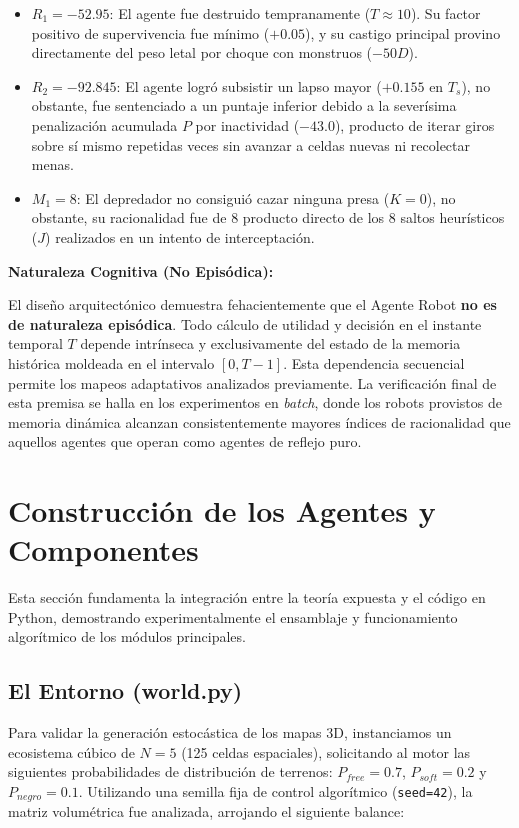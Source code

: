 \documentclass[conference]{IEEEtran}
\begin{document}
\begin{itemize}
    \item \textbf{$R_1 = -52.95$}: El agente fue destruido tempranamente ($T \approx 10$). Su factor positivo de supervivencia fue mínimo ($+0.05$), y su castigo principal provino directamente del peso letal por choque con monstruos ($-50 D$).
    \item \textbf{$R_2 = -92.845$}: El agente logró subsistir un lapso mayor ($+0.155$ en $T_s$), no obstante, fue sentenciado a un puntaje inferior debido a la severísima penalización acumulada $P$ por inactividad ($-43.0$), producto de iterar giros sobre sí mismo repetidas veces sin avanzar a celdas nuevas ni recolectar menas.
    \item \textbf{$M_1 = 8$}: El depredador no consiguió cazar ninguna presa ($K=0$), no obstante, su racionalidad fue de $8$ producto directo de los $8$ saltos heurísticos ($J$) realizados en un intento de interceptación.
\end{itemize}

\textbf{Naturaleza Cognitiva (No Episódica):}

El diseño arquitectónico demuestra fehacientemente que el Agente Robot \textbf{no es de naturaleza episódica}. Todo cálculo de utilidad y decisión en el instante temporal $T$ depende intrínseca y exclusivamente del estado de la memoria histórica moldeada en el intervalo $[0, T-1]$. Esta dependencia secuencial permite los mapeos adaptativos analizados previamente. La verificación final de esta premisa se halla en los experimentos en \textit{batch}, donde los robots provistos de memoria dinámica alcanzan consistentemente mayores índices de racionalidad que aquellos agentes que operan como agentes de reflejo puro.

\section{Construcción de los Agentes y Componentes}
Esta sección fundamenta la integración entre la teoría expuesta y el código en Python, demostrando experimentalmente el ensamblaje y funcionamiento algorítmico de los módulos principales.

\subsection{El Entorno (world.py)}
Para validar la generación estocástica de los mapas 3D, instanciamos un ecosistema cúbico de $N=5$ (125 celdas espaciales), solicitando al motor las siguientes probabilidades de distribución de terrenos: $P_{free}=0.7$, $P_{soft}=0.2$ y $P_{negro}=0.1$. Utilizando una semilla fija de control algorítmico (\texttt{seed=42}), la matriz volumétrica fue analizada, arrojando el siguiente balance:
\end{document}
